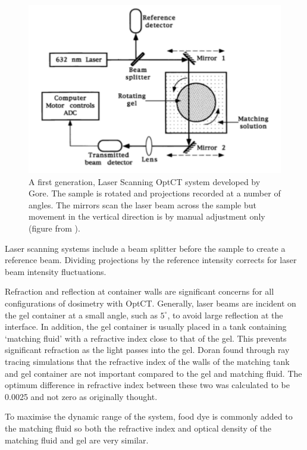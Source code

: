 \documentclass[12pt]{article}
\begin{document}
\begin{figure}[H]
\centering
\includegraphics[scale=0.6]{Gore_setup.pdf}
\caption{A first generation,  Laser Scanning OptCT system developed by Gore. The sample is rotated and projections recorded at a number of angles. The  mirrors scan the laser beam across the sample but movement in the vertical direction is by manual adjustment only (figure from \cite{Gore:1999tg}). }
\label{fig:gore_setup}
\end{figure}


Laser scanning systems include a  beam splitter before the sample to create a reference beam. Dividing projections by the reference intensity  corrects for laser beam intensity fluctuations. \cite{Gore:1999tg}

Refraction and reflection at container walls are significant concerns for all configurations of dosimetry with OptCT. Generally, laser beams are incident on the gel container at a small angle, such as $5^{\circ}$, to avoid large reflection at the interface. In addition, the gel container is usually placed in a tank containing `matching fluid' with a refractive index close to that of the gel. This prevents significant refraction as the light passes into the gel. Doran found through ray tracing simulations that the refractive index of the walls of the matching tank and  gel container are not important compared to the gel and matching fluid. The optimum difference in refractive index between these two was calculated to be 0.0025 and not zero as originally thought.\cite{Doran:2001ee}

To maximise the dynamic range of the system, food dye is commonly added to the matching fluid so both the refractive index and optical density of the matching fluid and gel are very similar.\cite{Krstajic:2006kna} 
\end{document}
